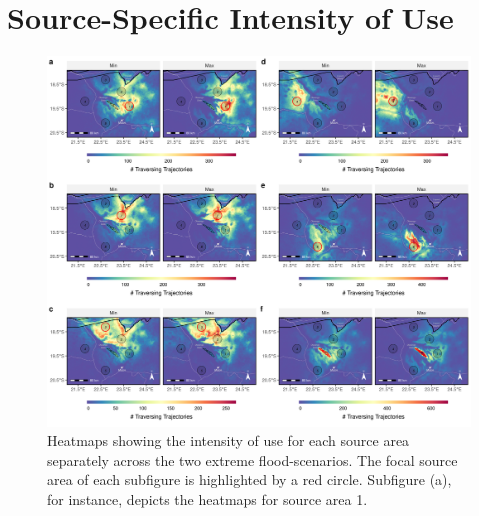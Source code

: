 \documentclass[abstract=on,10pt,a4paper,bibliography=totocnumbered]{article}
\begin{document}
\section{Source-Specific Intensity of Use}
\begin{figure}[htbp]
  \begin{center}
  \includegraphics[width = \textwidth]{Figures/HeatmapsIndividual.png}
  \caption{Heatmaps showing the intensity of use for each source area separately
  across the two extreme flood-scenarios. The focal source area of each
  subfigure is highlighted by a red circle. Subfigure (a), for instance, depicts
  the heatmaps for source area 1.}
  \label{Heatmaps}
  \end{center}
\end{figure}

\newpage
\end{document}
